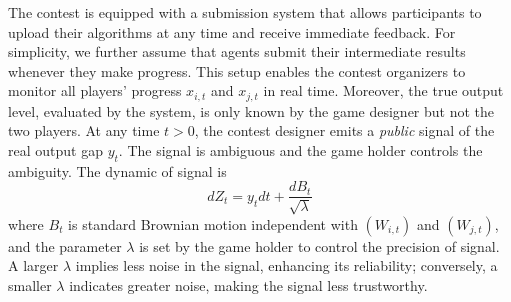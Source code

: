 \documentclass[mnsc]{informs3}
\begin{document}
The contest is equipped with a submission system that allows participants to upload their algorithms at any time and receive immediate feedback. 
For simplicity, we further assume that agents submit their intermediate results whenever they make progress. 
This setup enables the contest organizers to monitor all players’ progress $x_{i,t}$ and $x_{j,t}$ in real time. 
Moreover, the true output level, evaluated by the system, is only known by the game designer but not the two players. 
At any time $t>0$, the contest designer emits a \textit{public} signal of the real output gap $y_t$. 
The signal is ambiguous and the game holder controls the ambiguity. 
The dynamic of signal is  
\begin{equation}\label{signal}
	dZ_{t} = y_{t}dt + \frac{dB_{t}}{\sqrt{\lambda}} 
\end{equation}
where $B_{t}$ is standard Brownian motion independent with $(W_{i,t})$ and $(W_{j,t})$, and the parameter $\lambda$ is set by the game holder to control the precision of signal. 
A larger $\lambda$ implies less noise in the signal, enhancing its reliability; conversely, a smaller $\lambda$ indicates greater noise, making the signal less trustworthy. 
\end{document}
